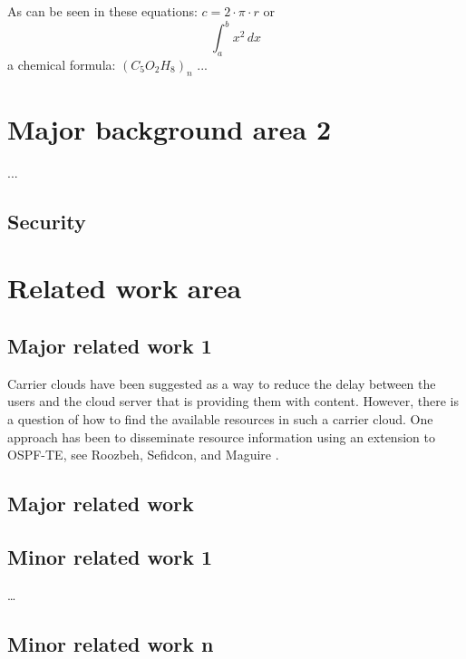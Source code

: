 As can be seen in these equations:
$c=2 \cdot \pi \cdot r$ or \[ \int_{a}^{b} x^2 \,dx \] a chemical formula: $(C_5O_2H_8)_n$
...
\section{Major background area 2} %
...
\subsection{ Security}%

\section{Related work area} %


\subsection{Major related work 1} %
Carrier clouds have been suggested as a way to reduce the delay between the users and the cloud server that is providing them with content. However, there is a question of how to find the available resources in such a carrier cloud. One approach has been to disseminate resource information using an extension to OSPF-TE, see Roozbeh, Sefidcon, and Maguire \cite{roozbeh_resource_2013}.


\subsection{Major related work} %

\subsection{Minor related work 1} %


…
\subsection{Minor related work n} %


